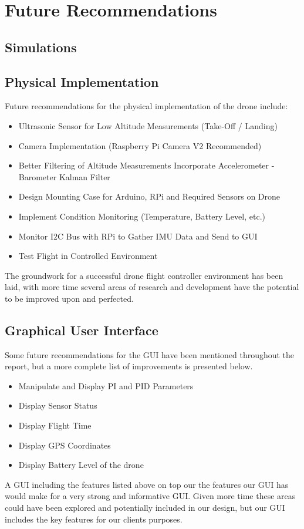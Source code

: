 \section{Future Recommendations}
\subsection{Simulations}


\subsection{Physical Implementation}

Future recommendations for the physical implementation of the drone include:

\begin{itemize}
\item Ultrasonic Sensor for Low Altitude Measurements (Take-Off / Landing)
\item Camera Implementation (Raspberry Pi Camera V2 Recommended)
\item Better Filtering of Altitude Measurements Incorporate Accelerometer - Barometer Kalman Filter
\item Design Mounting Case for Arduino, RPi and Required Sensors on Drone
\item Implement Condition Monitoring (Temperature, Battery Level, etc.)
\item Monitor I2C Bus with RPi to Gather IMU Data and Send to GUI
\item Test Flight in Controlled Environment
\end{itemize}

The groundwork for a successful drone flight controller environment has been laid, with more time several areas of research and development have the potential to be improved upon and perfected.


\subsection{Graphical User Interface}
Some future recommendations for the GUI have been mentioned throughout the report, but a more complete list of improvements is presented below. 

\begin{itemize}
	\item Manipulate and Display PI and PID Parameters
	\item Display Sensor Status
	\item Display Flight Time
	\item Display GPS Coordinates
	\item Display Battery Level of the drone
\end{itemize}

A GUI including the features listed above on top our the features our GUI has would make for a very strong and informative GUI. Given more time these areas could have been explored and potentially included in our design, but our GUI includes the key features for our clients purposes.
